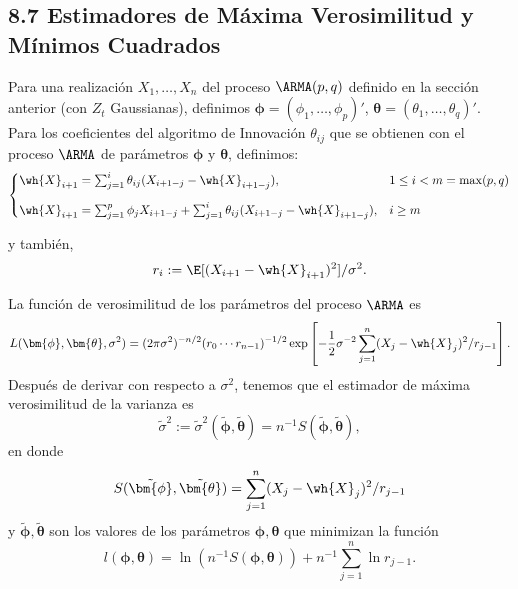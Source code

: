 \subsection*{8.7 Estimadores de Máxima Verosimilitud y Mínimos Cuadrados}

Para una realización $X_1,\ldots, X_n$ del proceso $\ARMA(p,q)$ definido en la sección anterior (con $Z_t$ Gaussianas), definimos $\bm{\phi} = (\phi_1,\ldots,\phi_p)'$, $\bm{\theta} = (\theta_1,\ldots, \theta_q)'$. Para los coeficientes del algoritmo de Innovación $\theta_{ij}$ que se obtienen con el proceso $\ARMA$ de parámetros $\bm{\phi}$ y $\bm{\theta}$, definimos:
\[ \begin{cases}
    \wh{X}_{i+1} = \sum_{j = 1}^i \theta_{ij} (X_{i+1-j} - \wh{X}_{i+1-j}), & 1 \leq i < m = \max(p,q)\\[1em]
    \wh{X}_{i+1} = \sum_{j = 1}^{p}\phi_j X_{i+1-j} + \sum_{j = 1}^i \theta_{ij} (X_{i+1-j} - \wh{X}_{i+1-j}), & i \geq m
\end{cases} \]

y también,
\[ r_i := \E[(X_{i+1}- \wh{X}_{i+1})^2] / \sigma^2. \]

La función de verosimilitud de los parámetros del proceso $\ARMA$ es
\[ L(\bm{\phi}, \bm{\theta}, \sigma^2) = (2\pi \sigma^2)^{-n/2}(r_0\cdots r_{n-1})^{-1/2} \exp\left[ -\frac{1}{2}\sigma^{-2} \sum_{j = 1}^n (X_j - \wh{X}_j)^2/r_{j-1} \right] . \]
Después de derivar con respecto a $\sigma^2$, tenemos que el estimador de máxima verosimilitud de la varianza es
\[ \tilde{\sigma}^2 := \tilde{\sigma}^2(\tilde{\bm{\phi}},\tilde{\bm{\theta}})  = n^{-1} S(\tilde{\bm{\phi}},\tilde{\bm{\theta}}), \]
en donde
\[ S(\tilde{\bm{\phi}},\tilde{\bm{\theta}}) = \sum_{j = 1}^n (X_j - \wh{X}_j)^2/r_{j-1} \]
y $\tilde{\bm{\phi}},\tilde{\bm{\theta}}$ son los valores de los parámetros $\bm\phi,\bm\theta$ que minimizan la función
\[ l(\bm\phi,\bm\theta) = \ln(n^{-1}S(\bm\phi,\bm\theta)) + n^{-1} \sum_{j = 1}^n \ln r_{j-1}. \]



